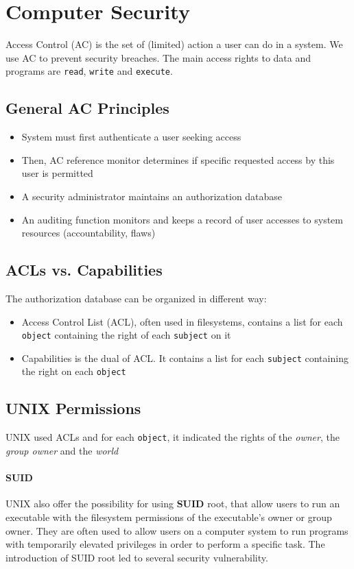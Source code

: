 \section{Computer Security}
Access Control (AC) is the set of (limited) action a user can do in a system. We use AC to prevent security breaches. The main access rights to data and programs are \texttt{read}, \texttt{write} and \texttt{execute}.
\subsection{General AC Principles}
\begin{itemize}
    \item System must first authenticate a user seeking access
    \item Then, AC reference monitor determines if specific requested access by this user is permitted
    \item A security administrator maintains an authorization database
    \item An auditing function monitors and keeps a record of user accesses to system resources (accountability, flaws)
\end{itemize}
\subsection{ACLs vs. Capabilities}
The authorization database can be organized in different way:
\begin{itemize}
    \item Access Control List (ACL), often used in filesystems, contains a list for each \texttt{object} containing the right of each \texttt{subject} on it
    \item Capabilities is the dual of ACL. It contains a list for each \texttt{subject} containing the right on each \texttt{object}
\end{itemize}
\subsection{UNIX Permissions}
UNIX used ACLs and for each \texttt{object}, it indicated the rights of the \textit{owner}, the \textit{group owner} and the \textit{world}
\paragraph{SUID}
UNIX also offer the possibility for using \textbf{SUID} root, that allow users to run an executable with the filesystem permissions of the executable's owner or group owner. They are often used to allow users on a computer system to run programs with temporarily elevated privileges in order to perform a specific task. The introduction of SUID root led to several security vulnerability.
